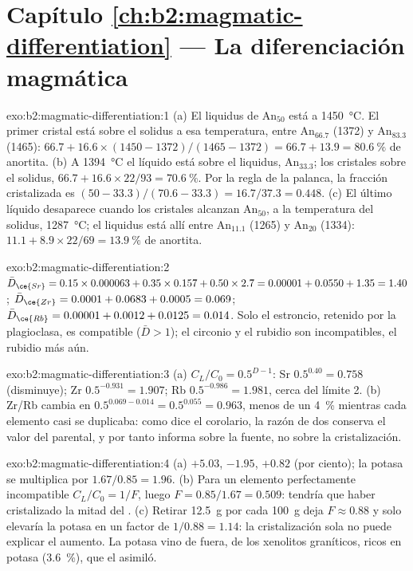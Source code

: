 \section*{Capítulo \ref{ch:b2:magmatic-differentiation} --- La diferenciación magmática}

\begin{solution}{exo:b2:magmatic-differentiation:1}
(a) El liquidus de An$_{50}$ está a \qty{1450}{\celsius}. El primer cristal está sobre el
solidus a esa temperatura, entre An$_{66.7}$ (1372) y An$_{83.3}$ (1465):
$66.7 + 16.6\times(1450 - 1372)/(1465 - 1372) = 66.7 + 13.9 = \qty{80.6}{\percent}$
de anortita. (b) A \qty{1394}{\celsius} el líquido está sobre el liquidus,
An$_{33.3}$; los cristales sobre el solidus, $66.7 + 16.6\times22/93 =
\qty{70.6}{\percent}$. Por la regla de la palanca, la fracción cristalizada es $(50 -
33.3)/(70.6 - 33.3) = 16.7/37.3 = 0.448$. (c) El último líquido desaparece cuando los
cristales alcanzan An$_{50}$, a la temperatura del solidus, \qty{1287}{\celsius}; el
liquidus está allí entre An$_{11.1}$ (1265) y An$_{20}$ (1334): $11.1 +
8.9\times22/69 = \qty{13.9}{\percent}$ de anortita.
\end{solution}

\begin{solution}{exo:b2:magmatic-differentiation:2}
$\bar D_{\ce{Sr}} = 0.15\times0.000063 + 0.35\times0.157 + 0.50\times2.7 = 0.00001 +
0.0550 + 1.35 = 1.40$; $\bar D_{\ce{Zr}} = 0.0001 + 0.0683 + 0.0005 = 0.069$;
$\bar D_{\ce{Rb}} = 0.00001 + 0.0012 + 0.0125 = 0.014$. Solo el estroncio, retenido por la
plagioclasa, es compatible ($\bar D > 1$); el circonio y el rubidio son incompatibles,
el rubidio más aún.
\end{solution}

\begin{solution}{exo:b2:magmatic-differentiation:3}
(a) $C_L/C_0 = 0.5^{D-1}$: Sr $0.5^{0.40} = 0.758$ (disminuye); Zr $0.5^{-0.931} =
1.907$; Rb $0.5^{-0.986} = 1.981$, cerca del límite 2. (b) Zr/Rb cambia en
$0.5^{0.069 - 0.014} = 0.5^{0.055} = 0.963$, menos de un \qty{4}{\percent} mientras cada
elemento casi se duplicaba: como dice el corolario, la razón de dos 
conserva el valor del  parental, y por tanto informa sobre la fuente, no
sobre la cristalización.
\end{solution}

\begin{solution}{exo:b2:magmatic-differentiation:4}
(a)  $+5.03$,  $-1.95$,  $+0.82$ (por ciento); la potasa
se multiplica por $1.67/0.85 = 1.96$. (b) Para un elemento perfectamente incompatible
$C_L/C_0 = 1/F$, luego $F = 0.85/1.67 = 0.509$: tendría que haber cristalizado la mitad del
. (c) Retirar \qty{12.5}{g} por cada \qty{100}{g} deja $F \approx 0.88$ y
solo elevaría la potasa en un factor de $1/0.88 = 1.14$: la cristalización sola no puede
explicar el aumento. La potasa vino de fuera, de los xenolitos graníticos, ricos en
potasa (\qty{3.6}{\percent}), que el  asimiló.
\end{solution}

